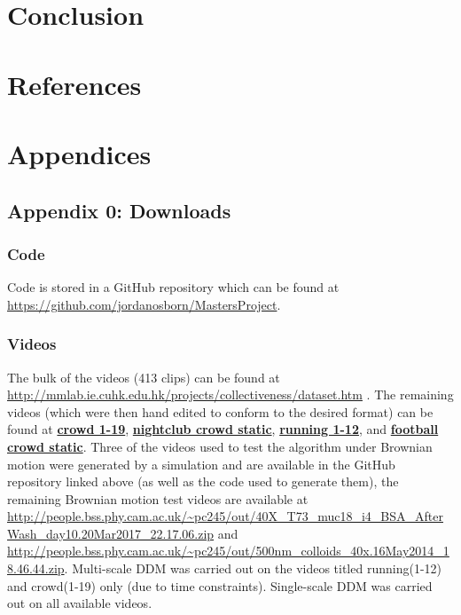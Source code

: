 \documentclass[10pt]{article}
\let\oldhref\href
\renewcommand{\href}[2]{\oldhref{#1}{\bfseries#2}}
\begin{document}


\section{Conclusion}


\clearpage
\section{References}
\printbibliography[heading=none]

\clearpage
\section{Appendices}
\subsection{Appendix 0: Downloads}
\subsubsection{Code}
Code is stored in a GitHub repository which can be found at \url{https://github.com/jordanosborn/MastersProject}.
\subsubsection{Videos}
The bulk of the videos (413 clips) can be found at \url{http://mmlab.ie.cuhk.edu.hk/projects/collectiveness/dataset.htm} \cite{crowdMotionDB}. The remaining videos (which were then hand edited to conform to the desired format) can be found at \href{https://www.youtube.com/watch?v=nrST7C_mDT8}{crowd 1-19}, \href{https://www.youtube.com/watch?v=lpEF1uyCH44}{nightclub crowd static},  \href{https://www.youtube.com/watch?v=sj2er0LPlH0}{running 1-12}, and \href{https://www.youtube.com/watch?v=AQdZ2OTF7VA}{football crowd static}. Three of the videos used to test the algorithm under Brownian motion were generated by a simulation and are available in the GitHub repository linked above (as well as the code used to generate them), the remaining Brownian motion test videos are available at \url{http://people.bss.phy.cam.ac.uk/~pc245/out/40X_T73_muc18_i4_BSA_AfterWash_day10.20Mar2017_22.17.06.zip} and \url{http://people.bss.phy.cam.ac.uk/~pc245/out/500nm_colloids_40x.16May2014_18.46.44.zip}. Multi-scale DDM was carried out on the videos titled running(1-12) and crowd(1-19) only (due to time constraints). Single-scale DDM was carried out on all available videos.
\end{document}
